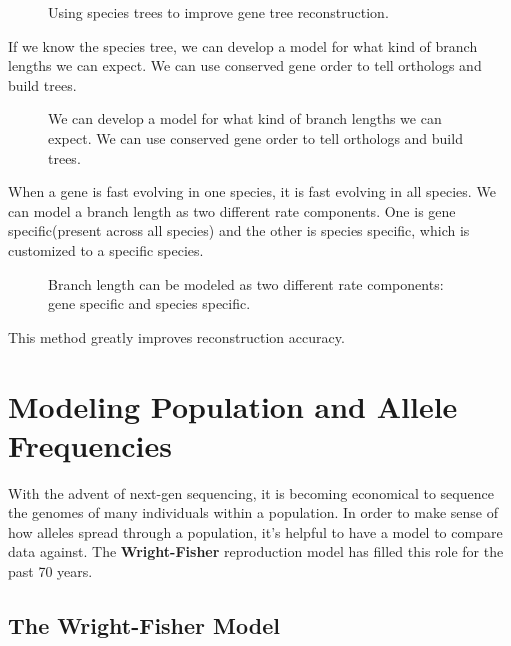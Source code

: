 \begin{figure}[ht!]
  \centering
  \caption{Using species trees to improve gene tree reconstruction.} 
  \label{Fig10_LearningAcrossGeneTrees}
\end{figure}

If we know the species tree, we can develop a model for what kind of
branch lengths we can expect. We can use conserved gene order to tell
orthologs and build trees.

\begin{figure}[ht!]
  \centering
  \caption{We can develop a model for what kind of branch lengths we
    can expect. We can use conserved gene order to tell orthologs and
    build trees.}
  \label{Fig11_DevelopingRatesModel}
\end{figure}

When a gene is fast evolving in one species, it is fast evolving in all
species. We can model a branch length as two different rate
components. One is gene specific(present across all species) and the other is
species specific, which is customized to a specific species.

\begin{figure} [ht!] 
  \centering
  \caption{Branch length can be modeled as two different rate
    components: gene specific and species specific.}
  \label{Fig12_UsingRateModels}
\end{figure} 

\noindent This method greatly improves reconstruction accuracy.


\section{Modeling Population and Allele Frequencies}
With the advent of next-gen sequencing, it is becoming economical to
sequence the genomes of many individuals within a population. In order
to make sense of how alleles spread through a population, it's helpful
to have a model to compare data against. The \textbf{Wright-Fisher} 
reproduction model has filled this role for the past 70 years.

\subsection{The Wright-Fisher Model}

